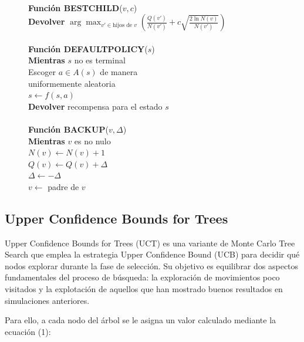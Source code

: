 \documentclass[conference,a4paper]{IEEEtran}
\begin{document}
\begin{figure}[t]
\begin{minipage}{\columnwidth}
\begin{pseudo}[compact, left-margin=0pt, label-align=l]
      \\

      \textbf{Función BESTCHILD}($v, c$) \\ 
      \> \textbf{Devolver} \mbox{$\displaystyle \arg\max_{v' \in \text{hijos de } v} \left( \frac{Q(v')}{N(v')} + c \sqrt{\frac{2 \ln N(v)}{N(v')}} \right)$} \\ 

      \\

      \textbf{Función DEFAULTPOLICY}($s$) \\ 
      \> \textbf{Mientras} $s$ no es terminal \\ 
      \> \> Escoger $a \in A(s)$ de manera \\ 
      \> \> uniformemente aleatoria \\ 
      \> \> $s \leftarrow f(s,a)$ \\ 
      \> \textbf{Devolver} recompensa para el estado $s$ \\ 

      \\

      \textbf{Función BACKUP}($v, \Delta$) \\ 
      \> \textbf{Mientras} $v$ es no nulo \\ 
      \> \> $N(v) \leftarrow N(v) + 1$ \\ 
      \> \> $Q(v) \leftarrow Q(v) + \Delta$ \\ 
      \> \> $\Delta \leftarrow -\Delta$ \\ 
      \> \> $v \leftarrow$ padre de $v$ 
    \end{pseudo}
  \end{minipage}
  \vspace{0.5em}
  \label{pcd:uct}
\end{figure}

\subsection{Upper Confidence Bounds for Trees} 
Upper Confidence Bounds for Trees (UCT) es una variante de Monte Carlo Tree Search que emplea la estrategia Upper Confidence Bound (UCB) para decidir qué nodos explorar durante la fase de selección. 
Su objetivo es equilibrar dos aspectos fundamentales del proceso de búsqueda: la exploración de movimientos poco visitados y la explotación de aquellos que han mostrado buenos resultados en simulaciones anteriores. 

Para ello, a cada nodo del árbol se le asigna un valor calculado mediante la ecuación (1): 
\end{document}
